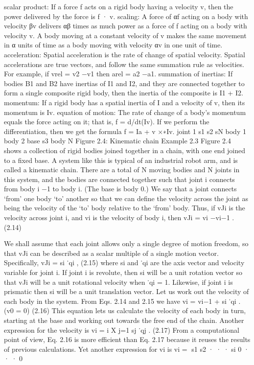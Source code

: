 scalar product: If a force f acts on a rigid body having a velocity v, then the power delivered by the force is f · v. scaling: A force of αf acting on a body with velocity βv delivers αβ times as much power as a force of f acting on a body with velocity v. A body moving at a constant velocity of v makes the same movement in α units of time as a body moving with velocity αv in one unit of time. acceleration: Spatial acceleration is the rate of change of spatial velocity. Spatial accelerations are true vectors, and follow the same summation rule as velocities. For example, if vrel = v2 −v1 then arel = a2 −a1. summation of inertias: If bodies B1 and B2 have inertias of I1 and I2, and they are connected together to form a single composite rigid body, then the inertia of the composite is I1 + I2. momentum: If a rigid body has a spatial inertia of I and a velocity of v, then its momentum is Iv. equation of motion: The rate of change of a body’s momentum equals the force acting on it; that is, f = d/dt(Iv). If we perform the differentiation, then we get the formula f = Ia + v ×∗Iv. joint 1 s1 s2 sN body 1 body 2 base s3 body N Figure 2.4: Kinematic chain Example 2.3 Figure 2.4 shows a collection of rigid bodies joined together in a chain, with one end joined to a fixed base. A system like this is typical of an industrial robot arm, and is called a kinematic chain. There are a total of N moving bodies and N joints in this system, and the bodies are connected together such that joint i connects from body i −1 to body i. (The base is body 0.) We say that a joint connects ‘from’ one body ‘to’ another so that we can define the velocity across the joint as being the velocity of the ‘to’ body relative to the ‘from’ body. Thus, if vJi is the velocity across joint i, and vi is the velocity of body i, then vJi = vi −vi−1 . (2.14)

We shall assume that each joint allows only a single degree of motion freedom, so that vJi can be described as a scalar multiple of a single motion vector. Specifically, vJi = si ˙qi , (2.15) where si and ˙qi are the axis vector and velocity variable for joint i. If joint i is revolute, then si will be a unit rotation vector so that vJi will be a unit rotational velocity when ˙qi = 1. Likewise, if joint i is prismatic then si will be a unit translation vector. Let us work out the velocity of each body in the system. From Eqs. 2.14 and 2.15 we have vi = vi−1 + si ˙qi . (v0 = 0) (2.16) This equation lets us calculate the velocity of each body in turn, starting at the base and working out towards the free end of the chain. Another expression for the velocity is vi = i X j=1 sj ˙qj . (2.17) From a computational point of view, Eq. 2.16 is more efficient than Eq. 2.17 because it reuses the results of previous calculations. Yet another expression for vi is vi = s1 s2 · · · si 0 · · · 0

